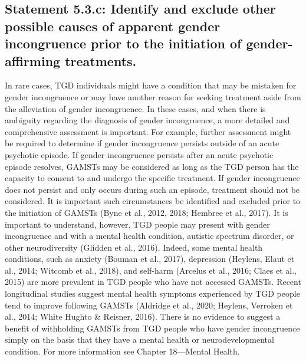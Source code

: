 \documentclass[
]{book}
\begin{document}
\hypertarget{statement-5.3.c-identify-and-exclude-other-possible-causes-of-apparent-gender-incongruence-prior-to-the-initiation-of-gender-affirming-treatments.}{%
\subsection*{Statement 5.3.c: Identify and exclude other possible causes of apparent gender incongruence prior to the initiation of gender-affirming treatments.}\label{statement-5.3.c-identify-and-exclude-other-possible-causes-of-apparent-gender-incongruence-prior-to-the-initiation-of-gender-affirming-treatments.}}

In rare cases, TGD individuals might have a condition that may be mistaken for gender incongruence or may have another reason for seeking
treatment aside from the alleviation of gender incongruence. In these cases, and when there is ambiguity
regarding the diagnosis of gender incongruence, a
more detailed and comprehensive assessment is
important. For example, further assessment might
be required to determine if gender incongruence
persists outside of an acute psychotic episode. If
gender incongruence persists after an acute psychotic
episode resolves, GAMSTs may be considered as
long as the TGD person has the capacity to consent
to and undergo the specific treatment. If gender
incongruence does not persist and only occurs
during such an episode, treatment should not be
considered. It is important such circumstances be
identified and excluded prior to the initiation of
GAMSTs (Byne et al., 2012, 2018; Hembree et al.,
2017). It is important to understand, however, TGD
people may present with gender incongruence and
with a mental health condition, autistic spectrum
disorder, or other neurodiversity (Glidden et al.,
2016). Indeed, some mental health conditions, such
as anxiety (Bouman et al., 2017), depression
(Heylens, Elaut et al., 2014; Witcomb et al., 2018),
and self-harm (Arcelus et al., 2016; Claes et al.,
2015) are more prevalent in TGD people who have
not accessed GAMSTs. Recent longitudinal studies
suggest mental health symptoms experienced by
TGD people tend to improve following GAMSTs
(Aldridge et al., 2020; Heylens, Verroken et al., 2014;
White Hughto \& Reisner, 2016). There is no evidence to suggest a benefit of withholding GAMSTs
from TGD people who have gender incongruence
simply on the basis that they have a mental health
or neurodevelopmental condition. For more information see Chapter 18---Mental Health.
\end{document}
